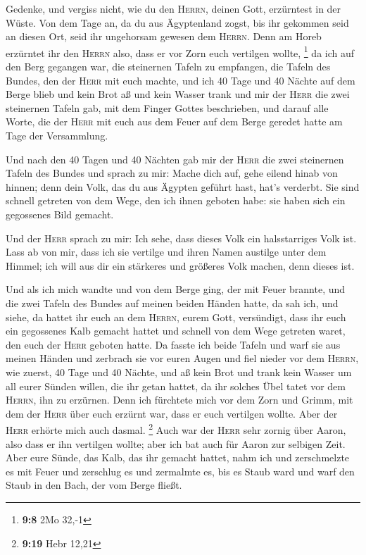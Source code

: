  Gedenke, und vergiss nicht, wie du den \textsc{Herrn},
deinen Gott, erzürntest in der Wüste. Von dem Tage an, da du aus
Ägyptenland zogst, bis ihr gekommen seid an diesen Ort, seid ihr
ungehorsam gewesen dem \textsc{Herrn}.  Denn am Horeb
erzürntet ihr den \textsc{Herrn} also, dass er vor Zorn euch vertilgen
wollte, \footnote{\textbf{9:8} 2Mo 32,-1}  da ich auf den
Berg gegangen war, die steinernen Tafeln zu empfangen, die Tafeln des
Bundes, den der \textsc{Herr} mit euch machte, und ich 40 Tage und 40
Nächte auf dem Berge blieb und kein Brot aß und kein Wasser trank
 und mir der \textsc{Herr} die zwei steinernen Tafeln
gab, mit dem Finger Gottes beschrieben, und darauf alle Worte, die der
\textsc{Herr} mit euch aus dem Feuer auf dem Berge geredet hatte am Tage
der Versammlung.

 Und nach den 40 Tagen und 40 Nächten gab mir der
\textsc{Herr} die zwei steinernen Tafeln des Bundes  und
sprach zu mir: Mache dich auf, gehe eilend hinab von hinnen; denn dein
Volk, das du aus Ägypten geführt hast, hat's verderbt. Sie sind schnell
getreten von dem Wege, den ich ihnen geboten habe: sie haben sich ein
gegossenes Bild gemacht.

 Und der \textsc{Herr} sprach zu mir: Ich sehe, dass
dieses Volk ein halsstarriges Volk ist.  Lass ab von mir,
dass ich sie vertilge und ihren Namen austilge unter dem Himmel; ich
will aus dir ein stärkeres und größeres Volk machen, denn dieses ist.

 Und als ich mich wandte und von dem Berge ging, der mit
Feuer brannte, und die zwei Tafeln des Bundes auf meinen beiden Händen
hatte,  da sah ich, und siehe, da hattet ihr euch an dem
\textsc{Herrn}, eurem Gott, versündigt, dass ihr euch ein gegossenes
Kalb gemacht hattet und schnell von dem Wege getreten waret, den euch
der \textsc{Herr} geboten hatte.  Da fasste ich beide
Tafeln und warf sie aus meinen Händen und zerbrach sie vor euren Augen
 und fiel nieder vor dem \textsc{Herrn}, wie zuerst, 40
Tage und 40 Nächte, und aß kein Brot und trank kein Wasser um all eurer
Sünden willen, die ihr getan hattet, da ihr solches Übel tatet vor dem
\textsc{Herrn}, ihn zu erzürnen.  Denn ich fürchtete mich
vor dem Zorn und Grimm, mit dem der \textsc{Herr} über euch erzürnt war,
dass er euch vertilgen wollte. Aber der \textsc{Herr} erhörte mich auch
dasmal. \footnote{\textbf{9:19} Hebr 12,21}  Auch war der
\textsc{Herr} sehr zornig über Aaron, also dass er ihn vertilgen wollte;
aber ich bat auch für Aaron zur selbigen Zeit.  Aber eure
Sünde, das Kalb, das ihr gemacht hattet, nahm ich und zerschmelzte es
mit Feuer und zerschlug es und zermalmte es, bis es Staub ward und warf
den Staub in den Bach, der vom Berge fließt.

